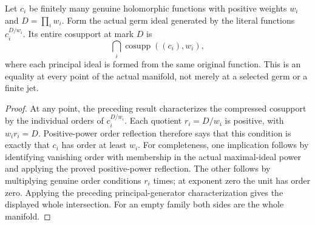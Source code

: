 \begin{theorem}
\label{hir:actual-commonmark-function-cosupport}
\leanok
Let $c_i$ be finitely many genuine holomorphic functions with positive weights
$w_i$ and $D=\prod_iw_i$. Form the actual germ ideal generated by the literal
functions $c_i^{D/w_i}$. Its entire cosupport at mark $D$ is
\[
 \bigcap_i\operatorname{cosupp}((c_i),w_i),
\]
where each principal ideal is formed from the same original function.
This is an equality at every point of the actual manifold, not merely at a
selected germ or a finite jet.
\end{theorem}
\begin{proof}
At any point, the preceding result characterizes the compressed cosupport by
the individual orders of $c_i^{D/w_i}$. Each quotient $r_i=D/w_i$ is positive,
with $w_ir_i=D$. Positive-power order reflection therefore says that this
condition is exactly that $c_i$ has order at least $w_i$. For completeness,
one implication follows by identifying vanishing order with membership in
the actual maximal-ideal power and applying the proved positive-power
reflection. The other follows by multiplying genuine order conditions
$r_i$ times; at exponent zero the unit has order zero. Applying the preceding
principal-generator characterization gives the displayed whole intersection.
For an empty family both sides are the whole manifold.
\end{proof}

